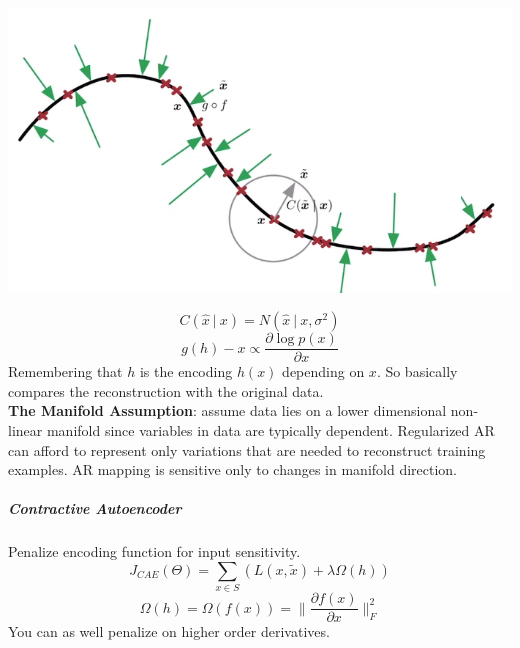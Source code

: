 \documentclass[10pt]{report}
\begin{document}
\begin{center}
	\includegraphics[scale=0.5]{77.png}
\end{center}
$$C(\hat{x}\:|\:x) = N(\hat{x}\:|\:x,\sigma^2)$$
$$g(h)-x\propto\frac{\partial\log p(x)}{\partial x}$$
Remembering that $h$ is the encoding $h(x)$ depending on $x$. So basically compares the reconstruction with the original data.\\
\textbf{The Manifold Assumption}: assume data lies on a lower dimensional non-linear manifold since variables in data are typically dependent. Regularized AR can afford to represent only variations that are needed to reconstruct training examples. AR mapping is sensitive only to changes in manifold direction.
\subparagraph{Contractive Autoencoder} Penalize encoding function for input sensitivity.
$$J_{CAE}(\Theta)=\sum_{x\in S} (L(x,\tilde{x}) + \lambda\Omega(h))$$
$$\Omega(h) = \Omega(f(x)) = \|\frac{\partial f(x)}{\partial x}\|^2_F$$
You can as well penalize on higher order derivatives.
\end{document}
